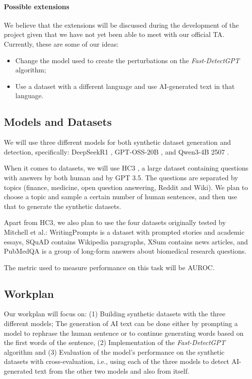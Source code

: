 \documentclass{article}
\begin{document}
\paragraph{Possible extensions} We believe that the extensions will be discussed during the development of the project given that we have not yet been able to meet with our official TA. Currently, these are some of our ideas:
\begin{itemize}
  \item Change the model used to create the perturbations on the \textit{Fast-DetectGPT} algorithm;
  \item Use a dataset with a different language and use AI-generated text in that language.
\end{itemize}

\subsection*{Models and Datasets}

We will use three different models for both synthetic dataset generation and detection, specifically: DeepSeekR1 \cite{deepseekai}, GPT-OSS-20B \cite{gptoss20bmodel}, and Qwen3-4B 2507 \cite{Qwen3}.

When it comes to datasets, we will use HC3 \cite{HC3}, a large dataset containing questions with answers by both human and by GPT 3.5. The questions are separated by topics (finance, medicine, open question answering, Reddit and Wiki). We plan to choose a topic and sample a certain number of human sentences, and then use that to generate the synthetic datasets.

Apart from HC3, we also plan to use the four datasets originally tested by Mitchell et al.\cite{detectgpt}: WritingPrompts \cite{writingprompts} is a dataset with prompted stories and academic essays, SQuAD \cite{SQuAD} contains Wikipedia paragraphs, XSum \cite{XSum} contains news articles, and PubMedQA \cite{PubMedQA} is a group of long-form answers about biomedical research questions.

The metric used to measure performance on this task will be AUROC.

\subsection*{Workplan}

Our workplan will focus on: (1) Building synthetic datasets with the three different models; The generation of AI text can be done either by prompting a model to rephrase the human sentence or to continue generating words based on the first words of the sentence, (2) Implementation of the \textit{Fast-DetectGPT} algorithm and (3) Evaluation of the model's performance on the synthetic datasets with cross-evaluation, i.e., using each of the three models to detect AI-generated text from the other two models and also from itself.



\nocite{*}
\end{document}
